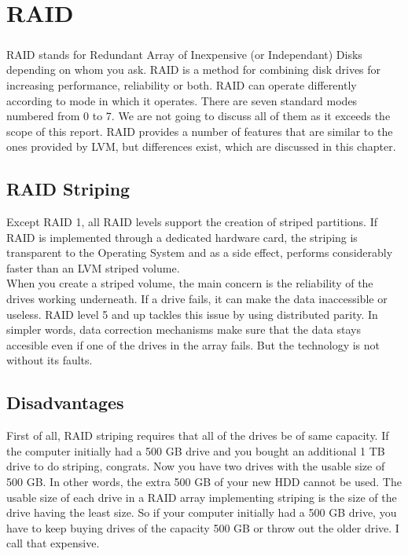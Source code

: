 \chapter{RAID}
\paragraph{}
RAID stands for Redundant Array of Inexpensive (or Independant) Disks depending
on whom you ask. RAID is a method for combining disk drives for increasing
performance, reliability or both. RAID can operate differently according to mode
in which it operates. There are seven standard modes numbered from 0 to 7. We
are not going to discuss all of them as it exceeds the scope of this report.
RAID provides a number of features that are similar to the ones provided by LVM,
but differences exist, which are discussed in this chapter.

\section{RAID Striping}
Except RAID 1, all RAID levels support the creation of striped partitions. If
RAID is implemented through a dedicated hardware card, the striping is
transparent to the Operating System and as a side effect, performs considerably
faster than an LVM striped volume.\\

When you create a striped volume, the main concern is the reliability of the
drives working underneath. If a drive fails, it can make the data inaccessible
or useless. RAID level 5 and up tackles this issue by using distributed parity.
In simpler words, data correction mechanisms make sure that the data stays
accesible even if one of the drives in the array fails. But the technology is
not without its faults.

\section{Disadvantages}
First of all, RAID striping requires that all of the drives be of same capacity.
If the computer initially had a 500 GB drive and you bought an additional 1 TB
drive to do striping, congrats. Now you have two drives with the usable size of
500 GB. In other words, the extra 500 GB of your new HDD cannot be used. The
usable size of each drive in a RAID array implementing striping is the size of
the drive having the least size. So if your computer initially had a 500 GB
drive, you have to keep buying drives of the capacity 500 GB or throw out the
older drive. I call that expensive.\\


